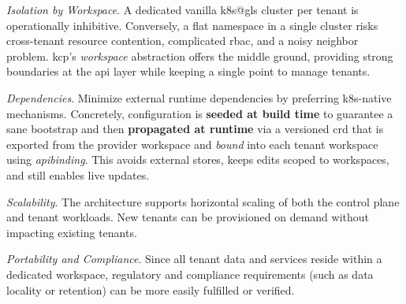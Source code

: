 \documentclass[11pt, a4paper, oneside, listof=totoc]{scrartcl}
\begin{document}
                \begin{enumerate}[label={[\arabic*]:},
                    ref=Challenge~\arabic*,
                    leftmargin=*,
                    itemsep=0.6\baselineskip]

                    \item\label{chal:isolationByWorkspace}
                        \textit{Isolation by Workspace}.
                        A dedicated vanilla \gls{k8s@gls} cluster per tenant is operationally
                        inhibitive.
                        Conversely, a flat namespace in a single cluster risks cross-tenant resource
                        contention, complicated \gls{rbac}, and a noisy neighbor problem.
                        \gls{kcp}'s \textit{workspace} abstraction offers the middle ground,
                        providing strong boundaries at the \gls{api} layer while keeping a single
                        point to manage tenants.

                    \item\label{chal:dependencies}
                        \textit{Dependencies}.
                        Minimize external runtime dependencies by preferring \gls{k8s}-native
                        mechanisms.
                        Concretely, configuration is \textbf{seeded at build time} to guarantee a
                        sane bootstrap and then \textbf{propagated at runtime} via a versioned
                        \gls{crd} that is exported from the provider workspace and \emph{bound} into
                        each tenant workspace using \emph{\gls{apibinding}}.
                        This avoids external stores, keeps edits scoped to workspaces, and still
                        enables live updates.

                    \item\label{chal:scalabilitySupport}
                        \textit{Scalability}.
                        The architecture supports horizontal scaling of both the
                        control plane and tenant workloads.
                        New tenants can be provisioned on demand without impacting existing tenants.

                    \item\label{chal:portabilityAndCompliance}
                        \textit{Portability and Compliance}.
                        Since all tenant data and services reside within a dedicated workspace,
                        regulatory and compliance requirements (such as data locality or retention)
                        can be more easily fulfilled or verified.


\end{enumerate}
\end{document}
